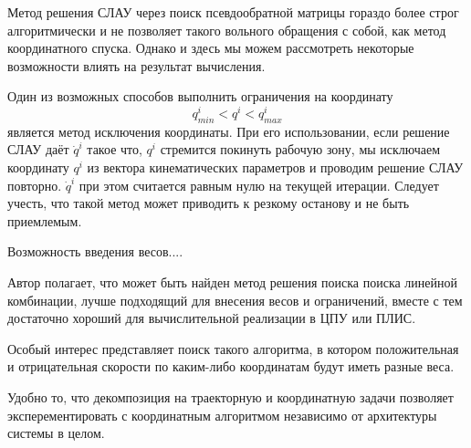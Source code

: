 Метод решения СЛАУ через поиск псевдообратной матрицы гораздо более строг алгоритмически и не позволяет такого вольного обращения с собой, как метод координатного спуска. Однако и здесь мы можем рассмотреть некоторые возможности влиять на результат вычисления.

Один из возможных способов выполнить ограничения на координату
\begin{equation}
q^i_{min} < q^i < q^i_{max} 
\end{equation} является метод исключения координаты. При его использовании, если решение СЛАУ даёт $\dot{q}^i$ такое что, $q^i$ стремится покинуть рабочую зону, мы исключаем координату $q^i$ из вектора кинематических параметров и проводим решение СЛАУ повторно. $\dot{q}^i$ при этом считается равным нулю на текущей итерации. Следует учесть, что такой метод может приводить к резкому останову и не быть приемлемым.

Возможность введения весов....

Автор полагает, что может быть найден метод решения поиска поиска линейной комбинации, лучше подходящий для внесения весов и ограничений, вместе с тем достаточно хороший для вычислительной реализации в ЦПУ или ПЛИС.

Особый интерес представляет поиск такого алгоритма, в котором положительная и отрицательная скорости по каким-либо координатам будут иметь разные веса. 

Удобно то, что декомпозиция на траекторную и координатную задачи позволяет эксперементировать с координатным алгоритмом независимо от архитектуры системы в целом.